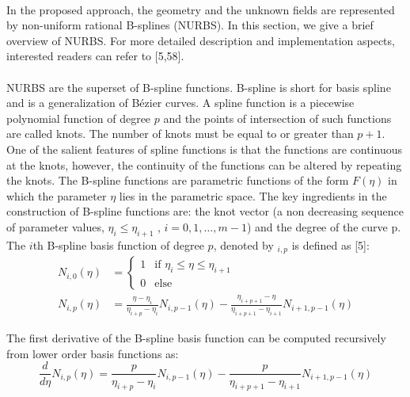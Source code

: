 
\paragraph{}
In the proposed approach, the geometry and the unknown fields are represented by non-uniform rational B-splines (NURBS).
In this section, we give a brief overview of NURBS.
For more detailed description and implementation aspects, interested readers can refer to [5,58].
\paragraph{}
NURBS are the superset of B-spline functions.
B-spline is short for basis spline and is a generalization of Bézier curves.
A spline function is a piecewise polynomial function of degree $p$ and the points of intersection of such functions are called knots.
The number of knots must be equal to or greater than $p + 1$.
One of the salient features of spline functions is that the functions are continuous at the knots, however, the continuity of the functions can be altered by repeating the knots.
The B-spline functions are parametric functions of the form $F(\eta)$ in which the parameter $\eta$ lies in the parametric space.
The key ingredients in the construction of B-spline functions are: the knot vector (a non decreasing sequence of parameter values, $\eta_i \leq \eta_{i+1}$ , $i = 0,1,\dots,m -1$) and the degree of the curve p. The $i$th B-spline basis function of degree $p$, denoted by $_{i,p}$ is defined as [5]:
\begin{equation}
    \begin{aligned}
        N_{i,0}(\eta) &=
            \begin{cases}
                1   & \text{if } \eta_i \leq \eta \leq \eta_{i+1}    \\
                0   & \text{else}
            \end{cases}\\
        N_{i,p}(\eta) &= 
            \frac{\eta - \eta_i}{\eta_{i+p}-\eta_i}     N_{i,p-1}(\eta) - 
            \frac{\eta_{i+p+1}-\eta}{\eta_{i+p+1} - \eta_{i+1}}     N_{i+1,p-1}(\eta)
    \end{aligned}
    \label{lr_nurbs_basis}
\end{equation}

The first derivative of the B-spline basis function can be computed recursively from lower order basis functions as:
\begin{equation}
    \frac{d}{d\eta} N_{i,p}(\eta) =
        \frac{p}{\eta_{i+p} - \eta_i} N_{i,p-1}(\eta) -
        \frac{p}{\eta_{i+p+1} - \eta_{i+1}} N_{i+1,p-1}(\eta)
\end{equation}

